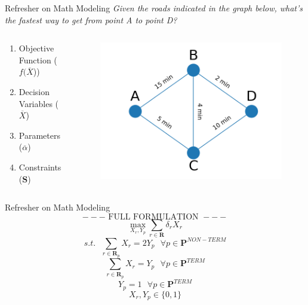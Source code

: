 \documentclass[10pt, aspectratio=169]{beamer}
\begin{document}
\begin{frame}{Refresher on Math Modeling}
    \textit{Given the roads indicated in the graph below, what's the fastest way to get from point A to point D?}

    \vspace{1.0cm}
    
    \begin{columns}
        \begin{column}{0.5\textwidth}
            \begin{enumerate}
                \item Objective Function ($f(\overline{X}$))
                \item Decision Variables ($\overline{X}$)
                \item Parameters ($\overline{\alpha}$)
                \item Constraints ($\textbf{S}$)
            \end{enumerate}
        \end{column}
        \begin{column}{0.5\textwidth}
            \begin{figure}
                \includegraphics[width=\linewidth]{../01_Introduction/RoutePlanningProblem.png}
            \end{figure}
        \end{column}
    \end{columns}
\end{frame}

\begin{frame}{Refresher on Math Modeling}
    $$---\text{ FULL FORMULATION }---$$
    $$\max_{X_r,Y_p} \sum_{r \in \textbf{R}} \delta_r X_r$$
    $$s.t.\ \ \ \sum_{r \in \textbf{R}_p} X_r = 2 Y_p \ \ \ \forall p \in \textbf{P}^{NON-TERM}$$
    $$\sum_{r \in \textbf{R}_p} X_r = Y_p \ \ \ \forall p \in \textbf{P}^{TERM}$$
    $$Y_p = 1 \ \ \ \forall p \in \textbf{P}^{TERM}$$
    $$X_r, Y_p \in \{0,1\}$$
\end{frame}
\end{document}
